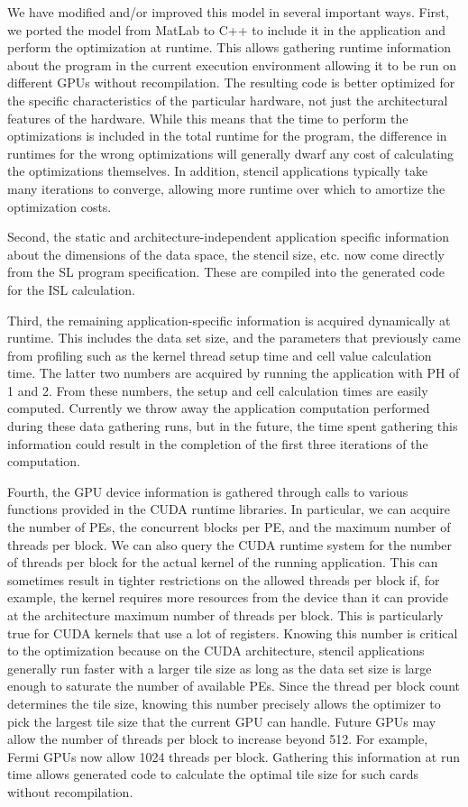 \documentclass[preprint,nocopyrightspace]{styles/sigplanconf}
\begin{document}
We have modified and/or improved this model in several important ways.  
First, we ported the model from MatLab to C++ to include it in the application 
and perform the optimization at runtime.  
This allows gathering runtime information about the program in 
the current execution environment allowing it to be  
run on different GPUs without recompilation. 
The resulting code is better optimized for the specific characteristics of the particular hardware, 
not just the architectural features of the hardware.  While this means that the time 
to perform the optimizations is included in the total runtime for the program, the difference 
in runtimes for the wrong optimizations will generally dwarf any cost of calculating the 
optimizations themselves.  In addition, stencil applications typically take many 
iterations to converge, allowing more runtime over which to amortize the optimization costs.

Second, the static and architecture-independent application specific information about the 
dimensions of the data space, the stencil size, etc. now come directly from the SL program specification.  
These are compiled into the generated code for the ISL calculation.

Third, the remaining application-specific information is acquired dynamically at runtime.  
This includes the data set size, and the parameters that previously came from profiling 
such as the kernel thread setup time and cell value calculation time.  The latter two 
numbers are acquired by running the application with PH of 1 and 2. From these numbers, 
the setup and cell calculation times are easily computed.  Currently we throw away the 
application computation performed during these data gathering runs, but 
in the future, the time spent gathering this information could result in the 
completion of the first three iterations of the computation.

Fourth, the GPU device information is gathered through calls
to various functions provided in the CUDA runtime libraries.  In particular, we can acquire 
the number of PEs, the concurrent blocks per PE, and the maximum number of threads  
per block.  We can also query the CUDA runtime system for the number of 
threads per block for the actual kernel of the running application.  This can sometimes result in 
tighter restrictions on the allowed threads per block if, for example, the kernel requires 
more resources from the device than it can provide at the architecture maximum number of threads per block.  
This is particularly true for CUDA kernels that use a lot of registers.  
Knowing this number is critical to the optimization
because on the CUDA architecture, stencil applications generally
run faster with a larger tile size as long as the data set size is 
large enough to saturate the number of available PEs.  
Since the thread per block count determines the tile size, 
knowing this number precisely allows the optimizer to pick the largest tile size that the current GPU can handle.
Future GPUs may allow the number of threads per block to increase beyond 512.  
For example, Fermi GPUs now allow 1024 threads per block.
Gathering this information at run time
allows generated code to calculate the optimal tile size for such cards without recompilation.
\end{document}

